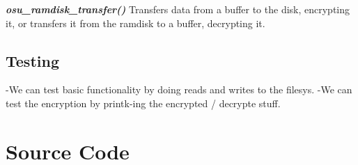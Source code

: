 \documentclass[11pt]{article}
\begin{document}
\textbf{\emph{osu\_ramdisk\_transfer()}} Transfers data from a buffer to
the disk, encrypting it, or transfers it from the ramdisk to a buffer,
decrypting it.

\subsection{Testing}

-We can test basic functionality by doing reads and writes to the
filesys. -We can test the encryption by printk-ing the encrypted /
decrypte stuff.

\section{Source Code}
\end{document}
